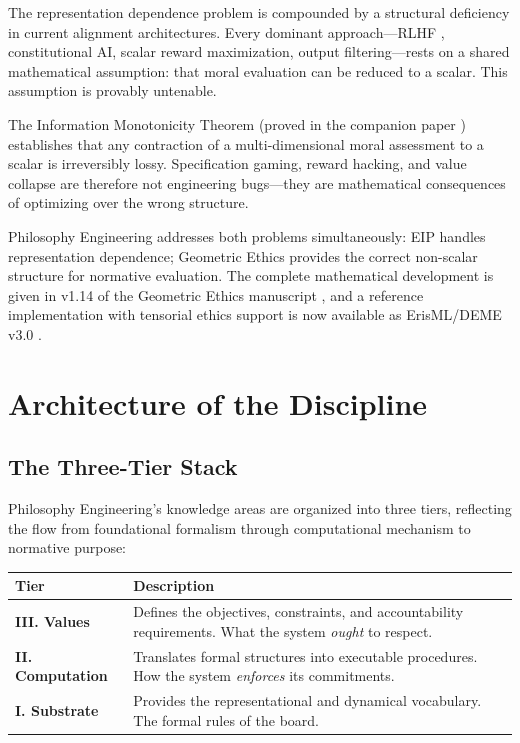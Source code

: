 \documentclass[12pt,letterpaper]{article}
\theoremstyle{definition}
\theoremstyle{plain}
\begin{document}
The representation dependence problem is compounded by a structural deficiency in current alignment architectures. Every dominant approach---RLHF \cite{christiano2017}, constitutional AI, scalar reward maximization, output filtering---rests on a shared mathematical assumption: that moral evaluation can be reduced to a scalar. This assumption is provably untenable.

The Information Monotonicity Theorem (proved in the companion paper \cite{bond2026geometric}) establishes that any contraction of a multi-dimensional moral assessment to a scalar is irreversibly lossy. Specification gaming, reward hacking, and value collapse are therefore not engineering bugs---they are mathematical consequences of optimizing over the wrong structure.

Philosophy Engineering addresses both problems simultaneously: EIP handles representation dependence; Geometric Ethics provides the correct non-scalar structure for normative evaluation. The complete mathematical development is given in v1.14 of the Geometric Ethics manuscript \cite{bond2026geometric}, and a reference implementation with tensorial ethics support is now available as ErisML/DEME v3.0 \cite{bond2026erisml}.


\section{Architecture of the Discipline}
\label{sec:architecture}

\subsection{The Three-Tier Stack}

Philosophy Engineering's knowledge areas are organized into three tiers, reflecting the flow from foundational formalism through computational mechanism to normative purpose:

\begin{center}
\renewcommand{\arraystretch}{1.4}
\begin{tabular}{>{\bfseries}p{3cm} p{9cm}}
\toprule
\textbf{Tier} & \textbf{Description} \\
\midrule
III. Values & Defines the objectives, constraints, and accountability requirements. What the system \emph{ought} to respect. \\
\addlinespace
II. Computation & Translates formal structures into executable procedures. How the system \emph{enforces} its commitments. \\
\addlinespace
I. Substrate & Provides the representational and dynamical vocabulary. The formal rules of the board. \\
\bottomrule
\end{tabular}
\end{center}
\end{document}
